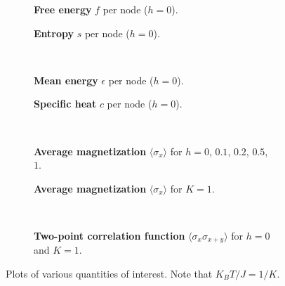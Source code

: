 \documentclass[12pt,a4paper]{report}
\begin{document}
\begin{figure}[H]
    \centering
    \begin{subfigure}{.5\textwidth}
        \centering
          
        \caption{\textbf{Free energy} $f$ per node ($h=0$).\label{fig:free-energy}}
    \end{subfigure}%
    \begin{subfigure}{.5\textwidth}
        \centering
        
        \caption{\textbf{Entropy} $s$ per node ($h=0$).\label{fig:entropy}}
    \end{subfigure}\\

    \begin{subfigure}{.5\textwidth}
        \centering
        
        \caption{\textbf{Mean energy} $\epsilon$ per node ($h=0$).\label{fig:mean-energy}}
    \end{subfigure}%
    \begin{subfigure}{.5\textwidth}
        \centering
        
        \caption{\textbf{Specific heat} $c$ per node ($h=0$).\label{fig:specific-heat}}
    \end{subfigure}\\

    \begin{subfigure}{.5\textwidth}
        \centering
        
        \caption{\textbf{Average magnetization} $\langle \sigma_x \rangle$ for $h=0$, $0.1$, $0.2$, $0.5$, $1$. \label{fig:magnetization-k}}
    \end{subfigure}%
    \begin{subfigure}{.5\textwidth}
        \centering
        
        \caption{\textbf{Average magnetization} $\langle \sigma_x \rangle$ for $K=1$.\label{fig:magnetization-h}}
    \end{subfigure}\\

    \begin{subfigure}{\textwidth}
        \centering
        
        \caption{\textbf{Two-point correlation function} $\langle \sigma_x \sigma_{x+y} \rangle$ for $h=0$ and $K=1$.\label{fig:correlation}}
    \end{subfigure}
    
    \caption{Plots of various quantities of interest. Note that $K_B T / J = 1/K$.\label{fig:plots}}
\end{figure}
\end{document}
